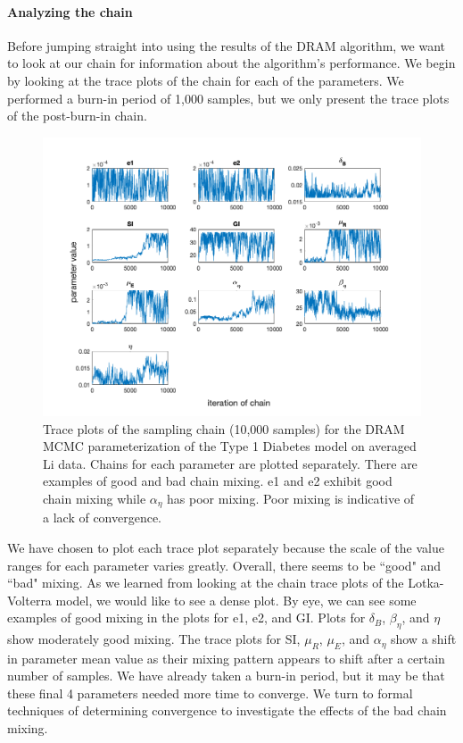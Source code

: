 \paragraph{Analyzing the chain}
Before jumping straight into using the results of the DRAM algorithm, we want to look at our chain for information about the algorithm's performance. We begin by looking at the trace plots of the chain for each of the parameters. We performed a burn-in period of 1,000 samples, but we only present the trace plots of the post-burn-in chain.
\begin{figure}[H]
    \centering
    \includegraphics[width=15cm]{MCMC_figs/dram_t1d_final/final_dram_avg_traceplot.png}
    \caption{Trace plots of the sampling chain (10,000 samples) for the DRAM MCMC parameterization of the Type 1 Diabetes model on averaged Li data. Chains for each parameter are plotted separately. There are examples of good and bad chain mixing. e1 and e2 exhibit good chain mixing while $\alpha_\eta$ has poor mixing. Poor mixing is indicative of a lack of convergence.}
    \label{fig:14mcmc}
\end{figure}
We have chosen to plot each trace plot separately because the scale of the value ranges for each parameter varies greatly. Overall, there seems to be ``good" and ``bad" mixing. As we learned from looking at the chain trace plots of the Lotka-Volterra model, we would like to see a dense plot. By eye, we can see some examples of good mixing in the plots for e1, e2, and GI. Plots for $\delta_B$, $\beta_{\eta}$, and $\eta$ show moderately good mixing. The trace plots for SI, $\mu_R$, $\mu_E$, and $\alpha_{\eta}$ show a shift in parameter mean value as their mixing pattern appears to shift after a certain number of samples. We have already taken a burn-in period, but it may be that these final 4 parameters needed more time to converge. We turn to formal techniques of determining convergence to investigate the effects of the bad chain mixing.
                            
